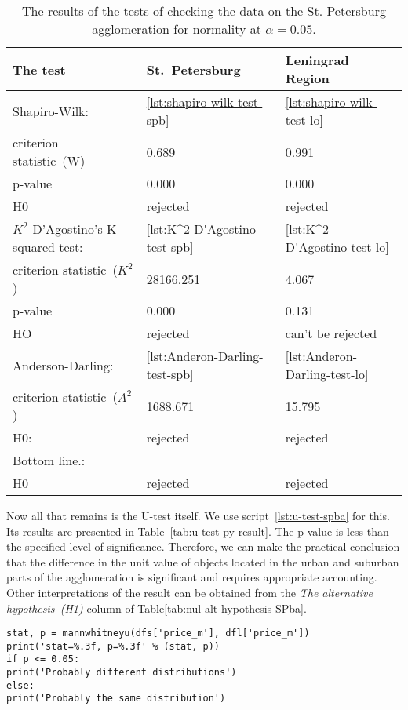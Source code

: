 \documentclass[]{scrreprt}
\begin{document}
\begin{table}[htp]
	\caption{The results of the tests of checking the data on the St. Petersburg agglomeration for normality at $\alpha=0.05$.}\label{tab:normality-tests-values}
	\centering
	\begin{tabular}{lll}
		\hline
		The test&St.~Petersburg&Leningrad Region\\
		\hline
		Shapiro-Wilk:&\ref{lst:shapiro-wilk-test-spb}&\ref{lst:shapiro-wilk-test-lo}\\
		criterion statistic~(W)&0.689&0.991\\
		p-value&0.000&0.000\\
		H0&rejected&rejected\\
		\hline
		$K^{2}$ D'Agostino's K-squared test:&\ref{lst:K^2-D'Agostino-test-spb}&\ref{lst:K^2-D'Agostino-test-lo}\\
		criterion statistic~($K^{2}$)&28166.251&4.067\\
	    p-value&0.000&0.131\\
		HO&rejected&can't be rejected\\
		\hline
		Anderson-Darling:&\ref{lst:Anderon-Darling-test-spb}&\ref{lst:Anderon-Darling-test-lo}\\
		criterion statistic~($A^{2}$)&1688.671&15.795\\
		H0:&rejected&rejected\\
		\hline
		Bottom line.:&&\\
		H0&rejected&rejected\\
		\hline
	\end{tabular}
\end{table}
%
Now all that remains is the U-test itself. We use script~\ref{lst:u-test-spba} for this. Its results are presented in Table~\ref{tab:u-test-py-result}. The p-value is less than the specified level of significance. Therefore, we can make the practical conclusion that the difference in the unit value of objects located in the urban and suburban parts of the agglomeration is significant and requires appropriate accounting. Other interpretations of the result can be obtained from the \textit{The alternative hypothesis~(H1)} column of Table\ref{tab:nul-alt-hypothesis-SPba}.
%
\begin{lstlisting}[float, caption = Wilcoxon--~Mann--~Whitney test for the data of unit prices of apartment offers in the agglomeration of St.~Petersburg, firstnumber=1, label= lst:u-test-spba]
stat, p = mannwhitneyu(dfs['price_m'], dfl['price_m'])
print('stat=%.3f, p=%.3f' % (stat, p))
if p <= 0.05:
print('Probably different distributions')
else:
print('Probably the same distribution')
\end{lstlisting}  
\end{document}
